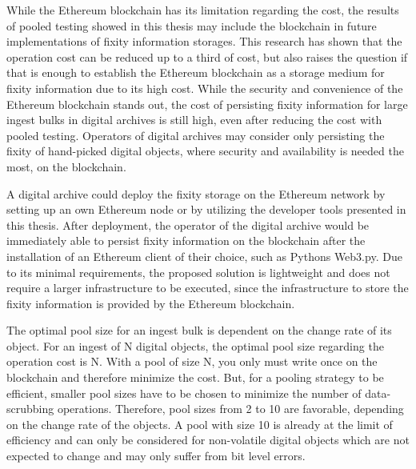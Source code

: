 While the Ethereum blockchain has its limitation regarding the cost, the results of pooled testing showed in this thesis may include the blockchain in future implementations of fixity information storages. This research has shown that the operation cost can be reduced up to a third of cost, but also raises the question if that is enough to establish the Ethereum blockchain as a storage medium for fixity information due to its high cost. While the security and convenience of the Ethereum blockchain stands out, the cost of persisting fixity information for large ingest bulks in digital archives is still high, even after reducing the cost with pooled testing. Operators of digital archives may consider only persisting the fixity of hand-picked digital objects, where security and availability is needed the most, on the blockchain.

A digital archive could deploy the fixity storage on the Ethereum network by setting up an own Ethereum node or by utilizing the developer tools presented in this thesis. After deployment, the operator of the digital archive would be immediately able to persist fixity information on the blockchain after the installation of an Ethereum client of their choice, such as Pythons Web3.py. Due to its minimal requirements, the proposed solution is lightweight and does not require a larger infrastructure to be executed, since the infrastructure to store the fixity information is provided by the Ethereum blockchain.

The optimal pool size for an ingest bulk is dependent on the change rate of its object. For an ingest of N digital objects, the optimal pool size regarding the operation cost is N. With a pool of size N, you only must write once on the blockchain and therefore minimize the cost. But, for a pooling strategy to be efficient, smaller pool sizes have to be chosen to minimize the number of data-scrubbing operations. Therefore, pool sizes from 2 to 10 are favorable, depending on the change rate of the objects. A pool with size 10 is already at the limit of efficiency and can only be considered for non-volatile digital objects which are not expected to change and may only suffer from bit level errors.

